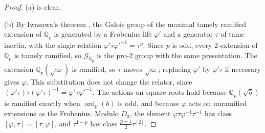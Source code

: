 \documentclass[11pt]{amsart}
\numberwithin{equation}{section}
\theoremstyle{definition}
\theoremstyle{remark}
\newcommand{\Q}{\mathbb Q}
\begin{document}
\begin{proof}
(a) is clear.

(b) By Iwasawa's theorem \cite[Theorem~7.5.3]{NeukirchSchmidtWingberg2008},
the Galois group of the maximal tamely ramified extension of $\Q_p$ is
generated by a Frobenius lift $\varphi'$ and a generator $\tau$ of tame
inertia, with the single relation $\varphi'\tau\varphi'^{-1}=\tau^p$. Since
$p$ is odd,
every $2$-extension of $\Q_p$ is tamely ramified, so $\mathcal G_{\Q_p}$ is
the pro-$2$ group with the same presentation. The extension
$\Q_p(\sqrt\varpi)$ is ramified, so $\tau$ moves $\sqrt\varpi$; replacing
$\varphi'$ by $\varphi'\tau$ if necessary gives $\varphi$. This substitution
does not change the relator, since
$(\varphi'\tau)\tau(\varphi'\tau)^{-1}=\varphi'\tau\varphi'^{-1}$.
The actions on square roots hold because $\Q_p(\sqrt b)$ is ramified exactly
when $\operatorname{ord}_p(b)$ is odd, and because $\varphi$ acts on unramified extensions as
the Frobenius. Modulo $D_3$, the element $\varphi\tau\varphi^{-1}\tau^{-1}$
has class $[\varphi,\tau]=[\tau,\varphi]$, and $\tau^{1-p}$ has class
$\frac{p-1}2\tau^{[2]}$.


\end{proof}
\end{document}
